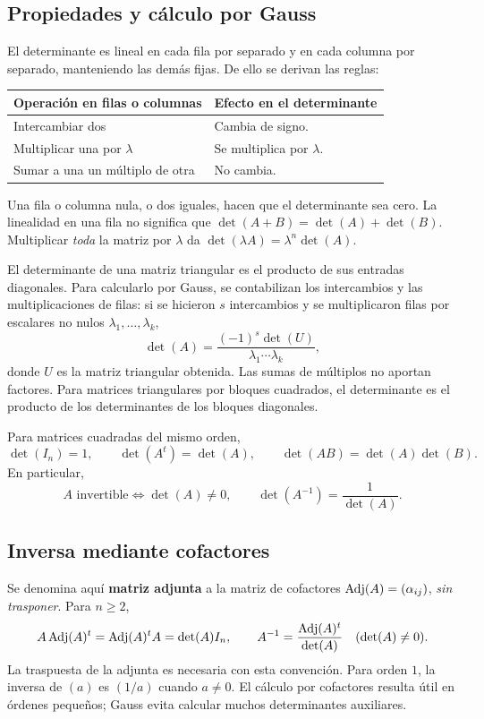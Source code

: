 \subsection*{Propiedades y cálculo por Gauss}

El determinante es lineal en cada fila por separado y en cada columna
por separado, manteniendo las demás fijas. De ello se derivan las reglas:
\begin{center}
\begin{tabular}{@{}ll@{}}
\toprule
Operación en filas o columnas & Efecto en el determinante \\
\midrule
Intercambiar dos & Cambia de signo. \\
Multiplicar una por $\lambda$ & Se multiplica por $\lambda$. \\
Sumar a una un múltiplo de otra & No cambia. \\
\bottomrule
\end{tabular}
\end{center}
Una fila o columna nula, o dos iguales, hacen que el determinante sea cero.
La linealidad en una fila no significa que $\det(A+B)=\det(A)+\det(B)$.
Multiplicar \emph{toda} la matriz por $\lambda$ da
$\det(\lambda A)=\lambda^n\det(A)$.

El determinante de una matriz triangular es el producto de sus entradas
diagonales. Para calcularlo por Gauss, se contabilizan los intercambios
y las multiplicaciones de filas: si se hicieron $s$ intercambios y se
multiplicaron filas por escalares no nulos $\lambda_1,\ldots,\lambda_k$,
\[
 \det(A)=\frac{(-1)^s\det(U)}{\lambda_1\cdots\lambda_k},
\]
donde $U$ es la matriz triangular obtenida. Las sumas de múltiplos no
aportan factores. Para matrices triangulares por bloques cuadrados,
el determinante es el producto de los determinantes de los bloques diagonales.

Para matrices cuadradas del mismo orden,
\[
 \det(I_n)=1,\qquad \det(A^t)=\det(A),\qquad
 \det(AB)=\det(A)\det(B).
\]
En particular,
\[
 A\text{ invertible}\iff\det(A)\ne0,
 \qquad \det(A^{-1})=\frac1{\det(A)}.
\]

\subsection*{Inversa mediante cofactores}

Se denomina aquí \textbf{matriz adjunta} a la matriz de cofactores
$\operatorname{Adj}(A)=(\alpha_{ij})$, \emph{sin trasponer}. Para $n\ge2$,
\[
 A\operatorname{Adj}(A)^t=\operatorname{Adj}(A)^tA=\det(A)I_n,
 \qquad A^{-1}=\frac{\operatorname{Adj}(A)^t}{\det(A)}\quad(\det(A)\ne0).
\]
La traspuesta de la adjunta es necesaria con esta convención.
Para orden $1$, la inversa de $(a)$ es $(1/a)$ cuando $a\ne0$.
El cálculo por cofactores resulta útil en órdenes pequeños;
Gauss evita calcular muchos determinantes auxiliares.

